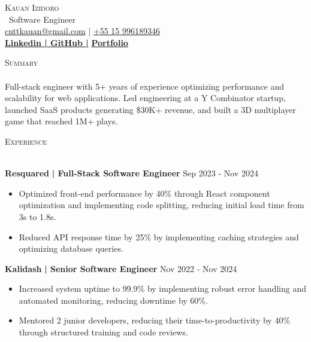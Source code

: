 \documentclass[a4paper]{article}
\newcommand{\lineunder}{
    \vspace*{-8pt} \\
    \hspace*{-18pt} \hrulefill \\
}
\newcommand{\header}[1]{
    {\hspace*{-18pt}\vspace*{6pt} \textsc{#1}}
    \vspace*{-6pt} \lineunder
}
\begin{document}
    \vspace*{-40pt}

    \vspace*{-2pt}
    \begin{center}
        {\Huge \scshape {Kauan Izidoro}}\\
        \vspace*{2pt}
        \ {Software Engineer}\\
        \vspace*{2pt}
        \href{mailto:cnttkauan@gmail.com}{cnttkauan@gmail.com} | \href{tel:+55 15 996189346}{+55 15 996189346}\\
        \vspace*{4pt}
        \textbf{\href{https://www.linkedin.com/in/kauanizidoro/}{Linkedin | }}\textbf{\href{https://github.com/KauanIzidoro}{GitHub |}}
        \textbf{\href{https://www.andreelias.dev}{Portfolio}}\\
    \end{center}

    \header{Summary}
    \vspace{2mm}
    Full-stack engineer with 5+ years of experience optimizing performance and scalability for web applications. Led engineering at a Y Combinator startup, launched SaaS products generating \$30K+ revenue, and built a 3D multiplayer game that reached 1M+ plays.
    \vspace{2mm}

    \header{Experience}
    \vspace{2mm}

    \textbf{Resquared}\textbf{ | Full-Stack Software Engineer} \hfill  Sep 2023 - Nov 2024\\
    \vspace{-3mm}
    \begin{itemize} \itemsep -3pt
        \item Optimized front-end performance by 40\% through React component optimization and implementing code splitting, reducing initial load time from 3s to 1.8s.
        \item Reduced API response time by 25\% by implementing caching strategies and optimizing database queries.
    \end{itemize}

    \textbf{Kalidash}\textbf{ | Senior Software Engineer } \hfill  Nov 2022 - Nov 2024\\
    \vspace{-3mm}
    \begin{itemize} \itemsep -3pt
        \item Increased system uptime to 99.9\% by implementing robust error handling and automated monitoring, reducing downtime by 60\%.
        \item Mentored 2 junior developers, reducing their time-to-productivity by 40\% through structured training and code reviews.
    \end{itemize}
\end{document}
